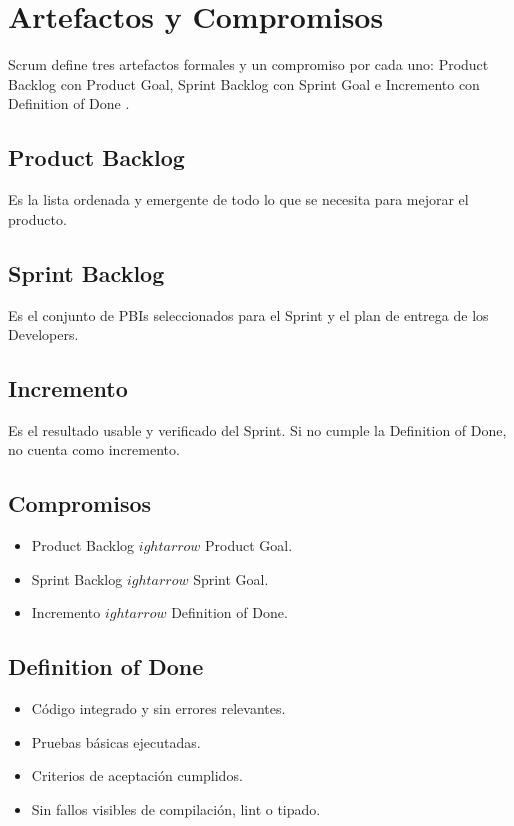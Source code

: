 \section{Artefactos y Compromisos}
Scrum define tres artefactos formales y un compromiso por cada uno: Product Backlog con Product Goal, Sprint Backlog con Sprint Goal e Incremento con Definition of Done \cite{schwaber2020}.

\subsection{Product Backlog}
Es la lista ordenada y emergente de todo lo que se necesita para mejorar el producto.

\subsection{Sprint Backlog}
Es el conjunto de PBIs seleccionados para el Sprint y el plan de entrega de los Developers.

\subsection{Incremento}
Es el resultado usable y verificado del Sprint. Si no cumple la Definition of Done, no cuenta como incremento.

\subsection{Compromisos}
\begin{itemize}[leftmargin=*]
    \item Product Backlog $
ightarrow$ Product Goal.
    \item Sprint Backlog $
ightarrow$ Sprint Goal.
    \item Incremento $
ightarrow$ Definition of Done.
\end{itemize}

\subsection{Definition of Done}
\begin{itemize}[leftmargin=*]
    \item C\'odigo integrado y sin errores relevantes.
    \item Pruebas b\'asicas ejecutadas.
    \item Criterios de aceptaci\'on cumplidos.
    \item Sin fallos visibles de compilaci\'on, lint o tipado.
\end{itemize}
